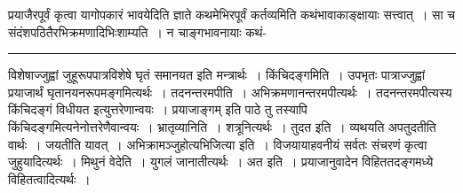 \documentclass[11pt, openany]{book}
\begin{document}
{\br प्रयाजैरपूर्वं कृत्वा यागोपकारं भावयेदिति ज्ञाते कथमेभिरपूर्वं कर्तव्यमिति कथंभावाकाङ्क्षायाः सत्त्वात्~। सा च संदंशपठितैरभिक्रमणादिभिःशाम्यति~। न चाङ्गभावनायाः कथं-\\}
\hrule
\vspace{3mm}
\noindent
विशेषाज्जुह्वां जुहूरूपपात्रविशेषे घृतं समानयत इति मन्त्रार्थः~। {\br किंचिदङ्गमिति~।} उपभृतः पात्राज्जुह्वां प्रयाजार्थं घृतानयनरूपमङ्गमित्यर्थः~। {\br तदनन्तरमपीति~।} अभिक्रमणानन्तरमपीत्यर्थः~। तदनन्तरमपीत्यस्य {\qt किंचिदङ्गं विधीयत} इत्युत्तरेणान्वयः~। {\qt प्रयाजाङ्गम्} इति पाठे तु तस्यापि किंचिदङ्गमित्यनेनोत्तरेणैवान्वयः~। {\br भ्रातृव्यानिति~।} शत्रूनित्यर्थः~। {\br तुदत इति~।} व्यथयति अपतुदतीति वार्थः~। जयतीति यावत्~। {\br अभिक्रामञ्जुहोत्यभिजित्या इति~।} विजयायाहवनीयं सर्वतः संचरणं कृत्वा जुहुयादित्यर्थः~। {\br मिथुनं वेदेति~।} युगलं जानातीत्यर्थः~। {\br अत इति~।} प्रयाजानुवादेन विहिततदङ्गमध्ये विहितत्वादित्यर्थः~।\\
\end{document}
